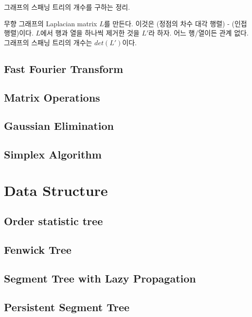 \documentclass[10pt,landscape,a4paper,twocolumn]{article}
\begin{document}
그래프의 스패닝 트리의 개수를 구하는 정리.

무향 그래프의 Laplacian matrix $L$를 만든다. 이것은 (정점의 차수 대각 행렬) - (인접행렬)이다.
$L$에서 행과 열을 하나씩 제거한 것을 $L'$라 하자. 어느 행/열이든 관계 없다.
그래프의 스패닝 트리의 개수는 $det(L')$이다.

\subsection{Fast Fourier Transform}


\subsection{Matrix Operations}

\subsection{Gaussian Elimination}

\subsection{Simplex Algorithm}


\section{Data Structure}

\subsection{Order statistic tree}


\subsection{Fenwick Tree}


\subsection{Segment Tree with Lazy Propagation}


\subsection{Persistent Segment Tree}
\end{document}

